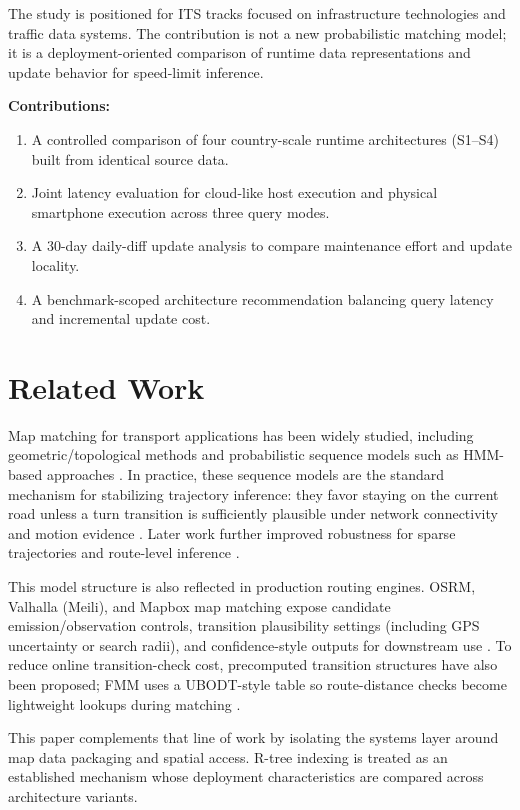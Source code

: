 \documentclass[conference]{IEEEtran}
\begin{document}
The study is positioned for ITS tracks focused on infrastructure technologies and traffic data systems. The contribution is not a new probabilistic matching model; it is a deployment-oriented comparison of runtime data representations and update behavior for speed-limit inference.

\textbf{Contributions:}
\begin{enumerate}
\item A controlled comparison of four country-scale runtime architectures (S1--S4) built from identical source data.
\item Joint latency evaluation for cloud-like host execution and physical smartphone execution across three query modes.
\item A 30-day daily-diff update analysis to compare maintenance effort and update locality.
\item A benchmark-scoped architecture recommendation balancing query latency and incremental update cost.
\end{enumerate}

\section{Related Work}
Map matching for transport applications has been widely studied, including geometric/topological methods \cite{quddus2007} and probabilistic sequence models such as HMM-based approaches \cite{newson2009,lou2009,goh2012,he2013}. In practice, these sequence models are the standard mechanism for stabilizing trajectory inference: they favor staying on the current road unless a turn transition is sufficiently plausible under network connectivity and motion evidence \cite{newson2009,hunter2014,goh2012,he2013}. Later work further improved robustness for sparse trajectories and route-level inference \cite{rahmani2013,quddus2015,jagadeesh2017,che2018}.

This model structure is also reflected in production routing engines. OSRM, Valhalla (Meili), and Mapbox map matching expose candidate emission/observation controls, transition plausibility settings (including GPS uncertainty or search radii), and confidence-style outputs for downstream use \cite{osrm_match_service,valhalla_meili,mapbox_map_matching_api}. To reduce online transition-check cost, precomputed transition structures have also been proposed; FMM uses a UBODT-style table so route-distance checks become lightweight lookups during matching \cite{yang2018fmm}.

This paper complements that line of work by isolating the systems layer around map data packaging and spatial access. R-tree indexing \cite{guttman1984} is treated as an established mechanism whose deployment characteristics are compared across architecture variants.
\end{document}

